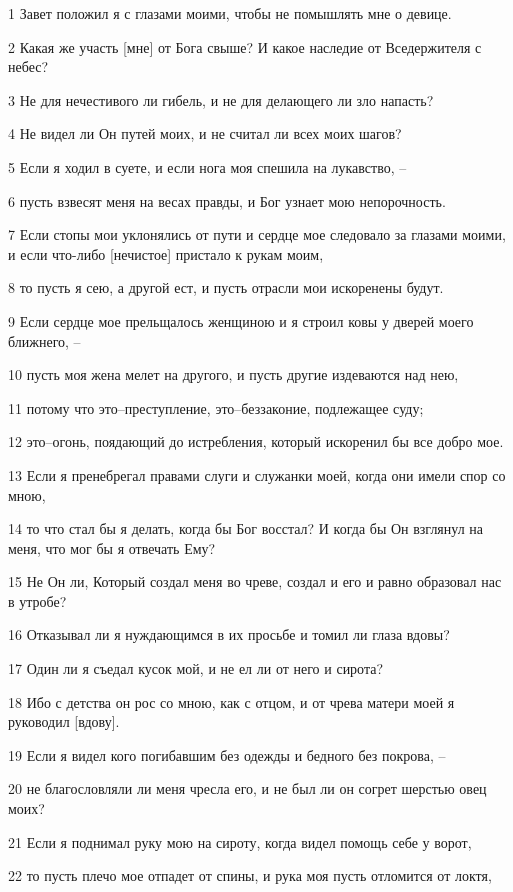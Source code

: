 \par 1 Завет положил я с глазами моими, чтобы не помышлять мне о девице.
\par 2 Какая же участь [мне] от Бога свыше? И какое наследие от Вседержителя с небес?
\par 3 Не для нечестивого ли гибель, и не для делающего ли зло напасть?
\par 4 Не видел ли Он путей моих, и не считал ли всех моих шагов?
\par 5 Если я ходил в суете, и если нога моя спешила на лукавство, --
\par 6 пусть взвесят меня на весах правды, и Бог узнает мою непорочность.
\par 7 Если стопы мои уклонялись от пути и сердце мое следовало за глазами моими, и если что-либо [нечистое] пристало к рукам моим,
\par 8 то пусть я сею, а другой ест, и пусть отрасли мои искоренены будут.
\par 9 Если сердце мое прельщалось женщиною и я строил ковы у дверей моего ближнего, --
\par 10 пусть моя жена мелет на другого, и пусть другие издеваются над нею,
\par 11 потому что это--преступление, это--беззаконие, подлежащее суду;
\par 12 это--огонь, поядающий до истребления, который искоренил бы все добро мое.
\par 13 Если я пренебрегал правами слуги и служанки моей, когда они имели спор со мною,
\par 14 то что стал бы я делать, когда бы Бог восстал? И когда бы Он взглянул на меня, что мог бы я отвечать Ему?
\par 15 Не Он ли, Который создал меня во чреве, создал и его и равно образовал нас в утробе?
\par 16 Отказывал ли я нуждающимся в их просьбе и томил ли глаза вдовы?
\par 17 Один ли я съедал кусок мой, и не ел ли от него и сирота?
\par 18 Ибо с детства он рос со мною, как с отцом, и от чрева матери моей я руководил [вдову].
\par 19 Если я видел кого погибавшим без одежды и бедного без покрова, --
\par 20 не благословляли ли меня чресла его, и не был ли он согрет шерстью овец моих?
\par 21 Если я поднимал руку мою на сироту, когда видел помощь себе у ворот,
\par 22 то пусть плечо мое отпадет от спины, и рука моя пусть отломится от локтя,
